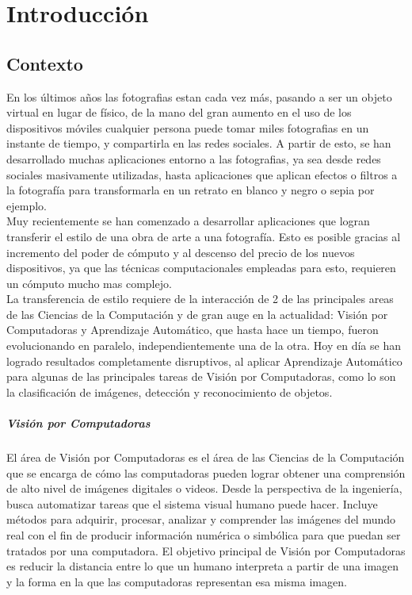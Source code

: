 \documentclass[a4paper,11pt,spanish]{book}
\begin{document}
\tableofcontents
\listoffigures 

\chapter{Introducción}
  \section {Contexto}
    En los últimos años las fotografias estan cada vez más, pasando a ser un objeto virtual en lugar de físico, de la mano del gran aumento en el uso de los dispositivos móviles 
    cualquier persona puede tomar miles fotografias en un instante de tiempo, y compartirla en las redes sociales.
    A partir de esto, se han desarrollado muchas aplicaciones entorno a las fotografias, ya sea desde redes sociales masivamente utilizadas, hasta aplicaciones que aplican efectos o filtros 
    a la fotografía para transformarla en un retrato en blanco y negro o sepia por ejemplo. \\
    Muy recientemente se han comenzado a desarrollar aplicaciones que logran transferir el estilo de una obra de arte a una fotografía. Esto es posible gracias al incremento 
    del poder de cómputo y al descenso del precio de los nuevos dispositivos, ya que las técnicas computacionales empleadas para esto, requieren un cómputo mucho mas complejo.\\
    La transferencia de estilo requiere de la interacción de 2 de las principales areas de las Ciencias de la Computación y de gran auge en la actualidad: Visión por Computadoras y Aprendizaje Automático,
    que hasta hace un tiempo, fueron evolucionando en paralelo, independientemente una de la otra. Hoy en día se han logrado resultados completamente disruptivos, al aplicar
    Aprendizaje Automático para algunas de las principales tareas de Visión por Computadoras, como lo son la clasificación de imágenes, detección y reconocimiento de objetos.\\
    \paragraph{Visión por Computadoras}
      El área de Visión por Computadoras es el área de las Ciencias de la Computación que se encarga de cómo las computadoras pueden lograr obtener una comprensión de alto nivel de imágenes digitales o videos. 
      Desde la perspectiva de la ingeniería, busca automatizar tareas que el sistema visual humano puede hacer. Incluye métodos para adquirir, procesar, analizar y comprender las imágenes del mundo real 
      con el fin de producir información numérica o simbólica para que puedan ser tratados por una computadora. El objetivo principal de Visión por Computadoras es reducir la distancia
      entre lo que un humano interpreta a partir de una imagen y la forma en la que las computadoras representan esa misma imagen.\\
\end{document}
